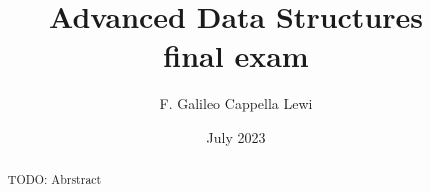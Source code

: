 \documentclass[12pt]{article}
\title{Advanced Data Structures\\\small{final exam}}
\date{July 2023}
\author{F. Galileo Cappella Lewi}
\begin{document}
\maketitle
\begin{abstract}
  TODO: Abrstract
\end{abstract}

\tableofcontents

\newpage
%


\end{document}
